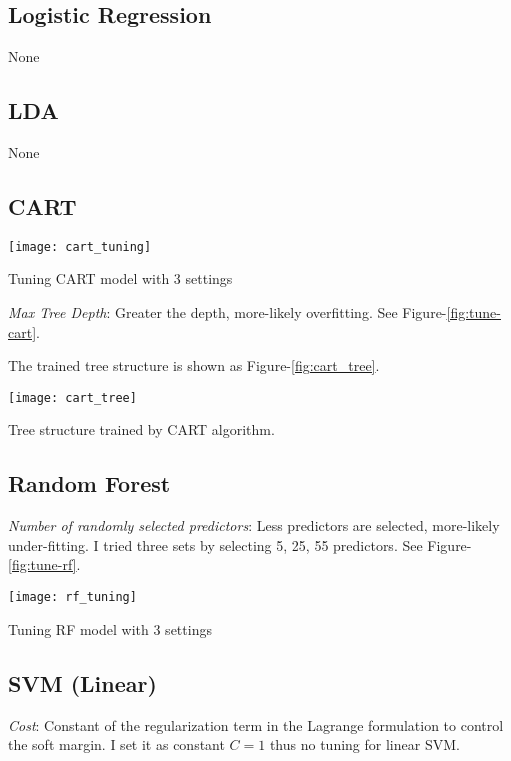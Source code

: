 \subsection{Logistic Regression}
None

\subsection{LDA}
None

\subsection{CART}

\begin{marginfigure}[-8in] %
\centering
	\texttt{[image: cart\_tuning]}
	\caption{Tuning CART model with 3 settings}
	\label{fig:tune-cart}
\end{marginfigure}

\textit{Max Tree Depth}: Greater the depth, more-likely overfitting. See Figure-\ref{fig:tune-cart}. 

The trained tree structure is shown as Figure-\ref{fig:cart_tree}. 

\begin{marginfigure}[-4in]
\centering
	\texttt{[image: cart\_tree]}
	\caption{Tree structure trained by CART algorithm. }
	\label{fig:cart_tree}
\end{marginfigure}

\subsection{Random Forest}

\textit{Number of randomly selected predictors}: Less predictors are selected, more-likely under-fitting. I tried three sets by selecting 5, 25, 55 predictors. See Figure-\ref{fig:tune-rf}.

\begin{marginfigure}
\centering
	\texttt{[image: rf\_tuning]}
	\caption{Tuning RF model with 3 settings}
	\label{fig:tune-rf}
\end{marginfigure}

\subsection{SVM (Linear)}
\textit{Cost}: Constant of the regularization term in the Lagrange formulation to control the soft margin. I set it as constant $C = 1$ thus no tuning for linear SVM. 

